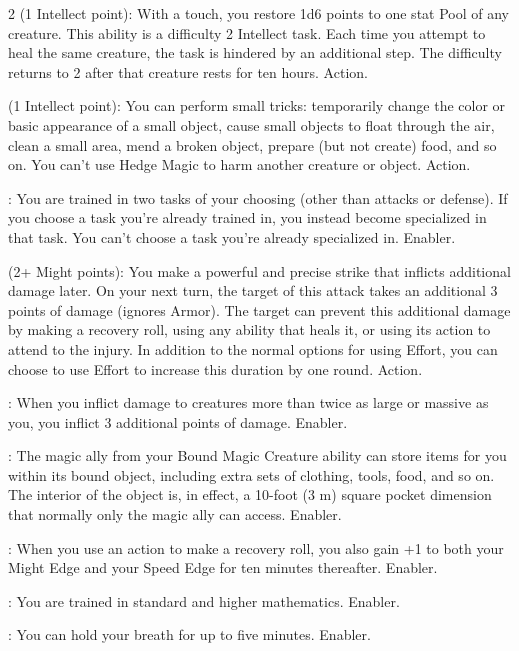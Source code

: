 \begin{multicols}{2}
 (1 Intellect point): With a touch, you restore 1d6 points to one stat Pool of any creature. This ability is a difficulty 2 Intellect task. Each time you attempt to heal the same creature, the task is hindered by an additional step. The difficulty returns to 2 after that creature rests for ten hours. Action. 
 
 (1 Intellect point): You can perform small tricks: temporarily change the color or basic appearance of a small object, cause small objects to float through the air, clean a small area, mend a broken object, prepare (but not create) food, and so on. You can’t use Hedge Magic to harm another creature or object. Action. 
 
: You are trained in two tasks of your choosing (other than attacks or defense). If you choose a task you’re already trained in, you instead become specialized in that task. You can’t choose a task you’re already specialized in. Enabler. 
 
 (2+ Might points): You make a powerful and precise strike that inflicts additional damage later. On your next turn, the target of this attack takes an additional 3 points of damage (ignores Armor). The target can prevent this additional damage by making a recovery roll, using any ability that heals it, or using its action to attend to the injury. In addition to the normal options for using Effort, you can choose to use Effort to increase this duration by one round. Action. 
 
: When you inflict damage to creatures more than twice as large or massive as you, you inflict 3 additional points of damage. Enabler. 
 
: The magic ally from your Bound Magic Creature ability can store items for you within its bound object, including extra sets of clothing, tools, food, and so on. The interior of the object is, in effect, a 10-foot (3 m) square pocket dimension that normally only the magic ally can access. Enabler. 
 
: When you use an action to make a recovery roll, you also gain +1 to both your Might Edge and your Speed Edge for ten minutes thereafter. Enabler. 
 
: You are trained in standard and higher mathematics. Enabler.
 
: You can hold your breath for up to five minutes. Enabler. 
 

\end{multicols}
